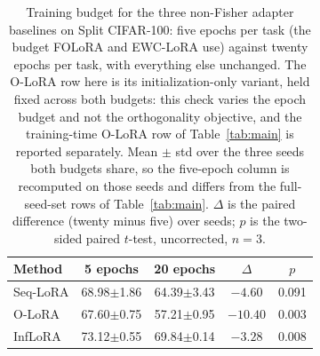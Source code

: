 \begin{table}[tbp]
\centering\footnotesize
\caption{Training budget for the three non-Fisher adapter baselines on Split CIFAR-100:
five epochs per task (the budget FOLoRA and EWC-LoRA use) against twenty epochs per task,
with everything else unchanged. The O-LoRA row here is its initialization-only variant, held
fixed across both budgets: this check varies the epoch budget and not the orthogonality
objective, and the training-time O-LoRA row of Table~\ref{tab:main} is reported separately.
Mean $\pm$ std over the three seeds both budgets share, so the five-epoch column is
recomputed on those seeds and differs from the full-seed-set rows of
Table~\ref{tab:main}. $\Delta$ is the paired difference
(twenty minus five) over seeds; $p$ is the two-sided paired $t$-test, uncorrected, $n{=}3$.}
\label{tab:epoch-budget}
\setlength{\tabcolsep}{5pt}
\begin{tabular}{@{}lcccc@{}}
\toprule
Method & 5 epochs & 20 epochs & $\Delta$ & $p$ \\
\midrule
Seq-LoRA & 68.98$\pm$1.86 & 64.39$\pm$3.43 & $-4.60$ & 0.091 \\
O-LoRA   & 67.60$\pm$0.75 & 57.21$\pm$0.95 & $-10.40$ & 0.003 \\
InfLoRA  & 73.12$\pm$0.55 & 69.84$\pm$0.14 & $-3.28$ & 0.008 \\
\bottomrule
\end{tabular}
\end{table}

